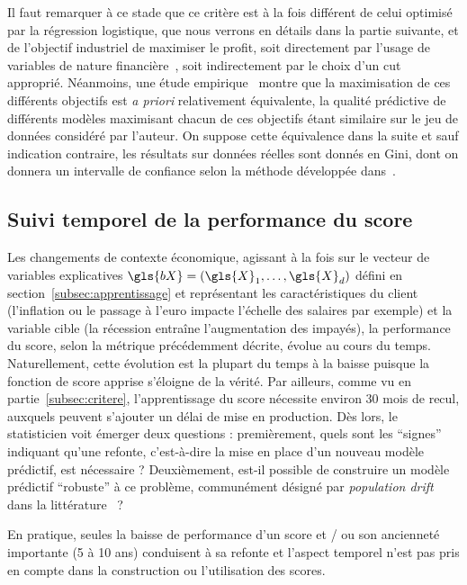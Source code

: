 Il faut remarquer à ce stade que ce critère est à la fois différent de celui optimisé par la régression logistique, que nous verrons en détails dans la partie suivante, et de l'objectif industriel de maximiser le profit, soit directement par l'usage de variables de nature financière~\cite{finlay2010credit}, soit indirectement par le choix d'un \gls{cut} approprié. Néanmoins, une étude empirique~\cite{finlay2009we} montre que la maximisation de ces différents objectifs est \textit{a priori} relativement équivalente, la qualité prédictive de différents modèles maximisant chacun de ces objectifs étant similaire sur le jeu de données considéré par l'auteur. On suppose cette équivalence dans la suite et sauf indication contraire, les résultats sur données réelles sont donnés en Gini, dont on donnera un intervalle de confiance selon la méthode développée dans~\cite{sun2014fast}.



\subsection{Suivi temporel de la performance du \gls{score}}

Les changements de contexte économique, agissant à la fois sur le vecteur de variables explicatives $\gls{bX} = (\gls{X}_1, \dots, \gls{X}_d)$ défini en section~\ref{subsec:apprentissage} et représentant les caractéristiques du client (l'inflation ou le passage à l'euro impacte l'échelle des salaires par exemple) et la variable cible (la récession entraîne l'augmentation des impayés), la performance du \gls{score}, selon la métrique précédemment décrite, évolue au cours du temps. Naturellement, cette évolution est la plupart du temps à la baisse puisque la fonction de \gls{score} apprise s'éloigne de la vérité. Par ailleurs, comme vu en partie~\ref{subsec:critere}, l'apprentissage du \gls{score} nécessite environ 30 mois de recul, auxquels peuvent s'ajouter un délai de mise en production. Dès lors, le statisticien voit émerger deux questions : premièrement, quels sont les ``signes'' indiquant qu'une refonte, c'est-à-dire la mise en place d'un nouveau modèle prédictif, est nécessaire ? Deuxièmement, est-il possible de construire un modèle prédictif ``robuste'' à ce problème, communément désigné par \textit{population drift} dans la littérature~\cite{hand1997statistical} ?

En pratique, seules la baisse de performance d'un \gls{score} et / ou son ancienneté importante (5 à 10 ans) conduisent à sa refonte et l'aspect temporel n'est pas pris en compte dans la construction ou l'utilisation des \glspl{score}.

